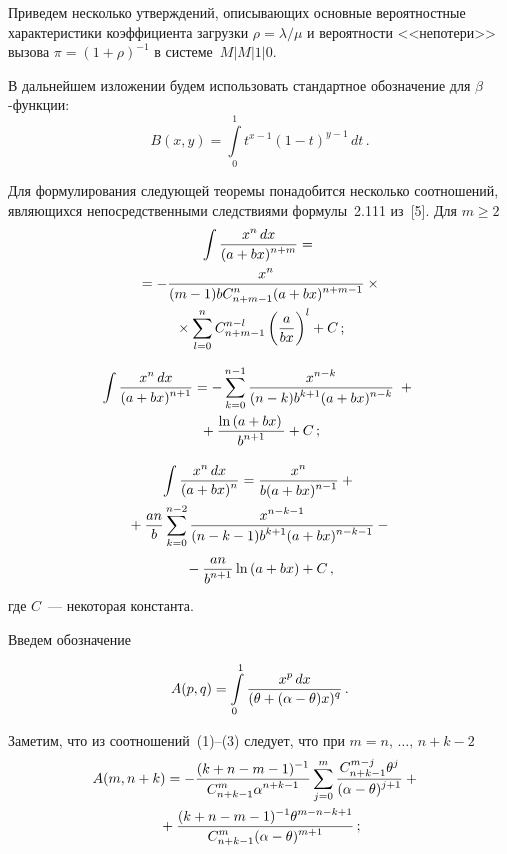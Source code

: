 \begin{multicols}{2}
Приведем несколько утверждений, опи\-сы\-ва\-ющих основные вероятностные характеристики коэффициента загрузки
$\rho=\lambda/\mu$ и вероятности <<непотери>> вызова $\pi=(1+\rho)^{-1}$ в системе~$M\vert M\vert 1\vert 0$.

В дальнейшем изложении будем использовать стандартное обозначение для $\beta$-функции:
$$
B(x, y)=\int\limits_0^1t^{x-1}(1-t)^{y-1}\, dt\,.
$$

Для формулирования следующей теоремы понадобится несколько соотношений, являющихся непосредственными следствиями
формулы~2.111 из~[5]. Для $m\ge2$
\begin{multline}
\int\displaystyle\frac{\displaystyle x^n\, dx\mathstrut}{\displaystyle (a+bx)^{n+m}\mathstrut}={}\\
 {}= -\displaystyle\frac{\displaystyle x^n\mathstrut}{\displaystyle (m-1)b
C_{n+m-1}^n(a+bx)^{n+m-1}\mathstrut}\times{}\\
{}\times
\sum\limits_{l=0}^n C_{n+m-1}^{n-l}\left(\displaystyle\frac{\displaystyle a\mathstrut}{\displaystyle bx\mathstrut} \right)^l+C\,;
\end{multline}
\vspace*{-12pt}

\noindent
\begin{multline}
\!\int\displaystyle\frac{\displaystyle x^n\, dx\mathstrut}{\displaystyle (a+bx)^{n+1}\mathstrut}=-\sum\limits_{k=0}^{n-1}\displaystyle\frac{\displaystyle x^{n-k}\mathstrut}{\displaystyle (n-k)b^{k+1}(a+bx)^{n-k}\mathstrut}\;+{}\\
{}+\displaystyle\frac{\displaystyle \ln\left(a+bx\right)\mathstrut}{\displaystyle b^{n+1}\mathstrut}+C\,;
\end{multline}

\vspace*{-12pt}
\noindent
\begin{multline}
\int\displaystyle\frac{\displaystyle x^n\, dx\mathstrut}{\displaystyle (a+bx)^n\mathstrut}=\displaystyle\frac{\displaystyle x^n\mathstrut}{\displaystyle b(a+bx)^{n-1}\mathstrut}+{}\\
{}+ \displaystyle\frac{\displaystyle an\mathstrut}{\displaystyle b\mathstrut}\sum\limits_{k=0}^{n-2}\displaystyle\frac{\displaystyle x^{n-k-1}\mathstrut}{\displaystyle (n-k-1)b^{k+1}(a+bx)^{n-k-1}\mathstrut}-{}\\
{}- 
\displaystyle\frac{\displaystyle an\mathstrut}{\displaystyle b^{n+1}\mathstrut}\ln\left(a+bx\right)+C\,,
\end{multline}
где $C$~--- некоторая константа.


Введем обозначение

\noindent
\begin{equation}
A(p,q)=\int\limits_0^1 \fr{x^p\,dx}{(\theta+(\alpha-\theta)x)^q}\,.
\label{e4kud}
\end{equation}

Заметим, что из соотношений~(1)--(3) следует, что при $m=n,\,\ldots,\,n+k-2$
\begin{multline}
\!\!\!A(m,n+k)=-\fr{(k+n-m-1)^{-1}}{C_{n+k-1}^{m}\alpha^{n+k-1}}\sum\limits_{j=0}^{m}\fr{C_{n+k-1}^{m-j}\theta^j}{(\alpha
-\theta)^{j+1}}+{}\\
{}+
\fr{(k+n-m-1)^{-1}\theta^{m-n-k+1}}{C_{n+k-1}^{m}(\alpha-\theta)^{m+1}}\,;
\label{e5kud}
\end{multline}
\vspace*{-12pt}


\end{multicols}
